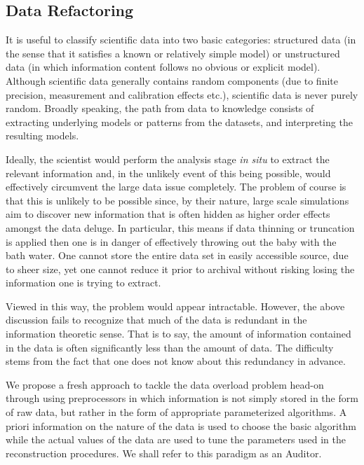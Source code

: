 \subsection{Data Refactoring}



It is useful to classify scientific data into two basic categories: structured
data (in the sense that it satisfies a known or relatively simple model) or
unstructured data (in which information content follows no obvious or explicit
model).  Although scientific data generally contains random components (due to
finite precision, measurement and calibration effects etc.), scientific data is
never purely random. Broadly speaking, the path from data to knowledge consists
of extracting underlying models or patterns from the datasets, and interpreting
the resulting models. 

Ideally, the scientist would perform the analysis stage {\em in situ} to
extract the relevant information and, in the unlikely event of this being
possible, would effectively circumvent the large data issue completely.  The
problem of course is that this is unlikely to be possible since, by their
nature, large scale simulations aim to discover new information that is often
hidden as higher order effects amongst the data deluge. In particular, this
means if data thinning or truncation is applied then one is in danger of
effectively throwing out the baby with the bath water. One cannot store the
entire data set in easily accessible source, due to sheer size, yet one cannot
reduce it prior to archival without risking losing the information one is
trying to extract.  

Viewed in this way, the problem would appear intractable. However, the above
discussion fails to recognize that much of the data is redundant in the
information theoretic sense.  That is to say, the amount of information
contained in the data is often significantly less than the amount of data.  The
difficulty stems from the fact that one does not know about this redundancy in
advance. 


We propose a fresh approach to tackle the data overload problem head-on through
using preprocessors in which information is not simply stored in the form of
raw data, but rather in the form of appropriate parameterized algorithms. A
priori information on the nature of the data is used to choose the basic
algorithm while the actual values of the data are used to tune the parameters
used in the reconstruction procedures. We shall refer to this paradigm as an
Auditor.

